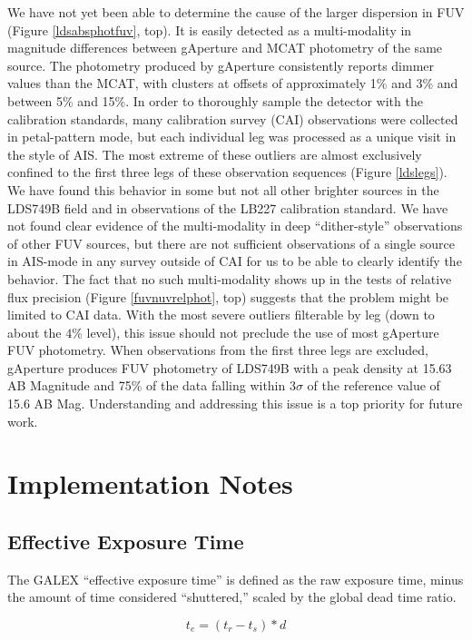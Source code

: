 \documentclass[preprint]{aastex}
\begin{document}
We have not yet been able to determine the cause of the larger dispersion in FUV (Figure \ref{ldsabsphotfuv}, top). It is easily detected as a multi-modality in magnitude differences between gAperture and MCAT photometry of the same source. The photometry produced by gAperture consistently reports dimmer values than the MCAT, with clusters at offsets of approximately 1\% and 3\% and between 5\% and 15\%. In order to thoroughly sample the detector with the calibration standards, many calibration survey (CAI) observations were collected in petal-pattern mode, but each individual leg was processed as a unique visit in the style of AIS. The most extreme of these outliers are almost exclusively confined to the first three legs of these observation sequences (Figure \ref{ldslegs}). We have found this behavior in some but not all other brighter sources in the LDS749B field and in observations of the LB227 calibration standard. We have not found clear evidence of the multi-modality in deep ``dither-style'' observations of other FUV sources, but there are not sufficient observations of a single source in AIS-mode in any survey outside of CAI for us to be able to clearly identify the behavior. The fact that no such multi-modality shows up in the tests of relative flux precision (Figure \ref{fuvnuvrelphot}, top) suggests that the problem might be limited to CAI data. With the most severe outliers filterable by leg (down to about the $4$\% level), this issue should not preclude the use of most gAperture FUV photometry. When observations from the first three legs are excluded, gAperture produces FUV photometry of LDS749B with a peak density at 15.63 AB Magnitude and 75\% of the data falling within 3$\sigma$ of the reference value of 15.6 AB Mag. Understanding and addressing this issue is a top priority for future work.

\section{Implementation Notes}
\label{implementation}

\subsection{Effective Exposure Time}
\label{effexptime}
The GALEX ``effective exposure time'' is defined as the raw exposure time, minus the amount of time considered ``shuttered,'' scaled by the global dead time ratio.

\[t_e=(t_r-t_s)*d\]
\end{document}
